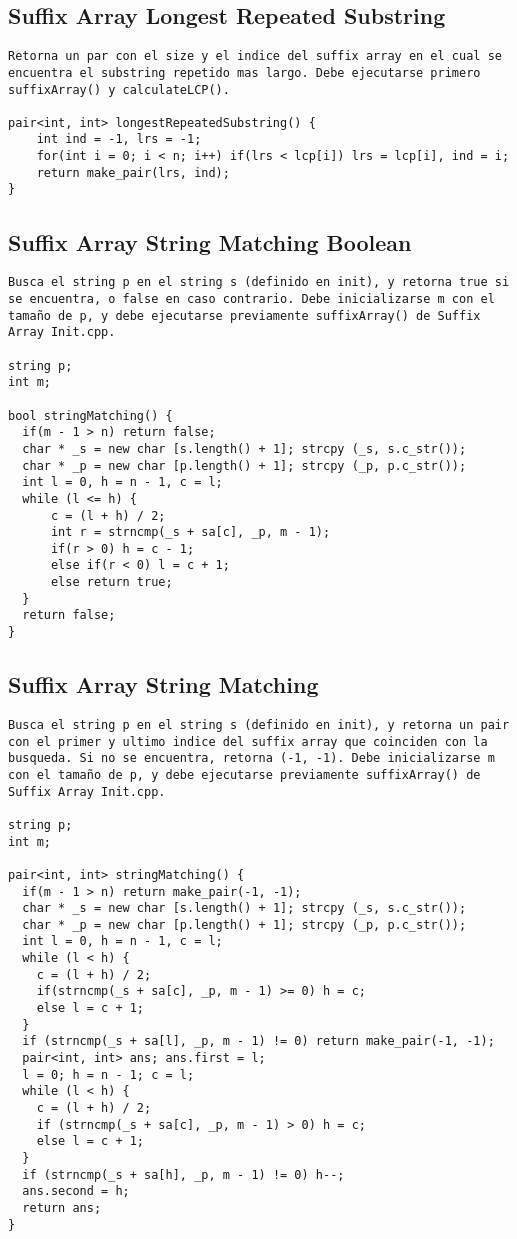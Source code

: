 \documentclass[10pt,letterpaper,twocolumn,twosided]{article}
\begin{document}
\subsection{Suffix Array Longest Repeated Substring}
\begin{lstlisting}
Retorna un par con el size y el indice del suffix array en el cual se encuentra el substring repetido mas largo. Debe ejecutarse primero suffixArray() y calculateLCP().

pair<int, int> longestRepeatedSubstring() {
	int ind = -1, lrs = -1;
	for(int i = 0; i < n; i++) if(lrs < lcp[i]) lrs = lcp[i], ind = i;
	return make_pair(lrs, ind);
}\end{lstlisting}

\subsection{Suffix Array String Matching Boolean}
\begin{lstlisting}
Busca el string p en el string s (definido en init), y retorna true si se encuentra, o false en caso contrario. Debe inicializarse m con el tamaño de p, y debe ejecutarse previamente suffixArray() de Suffix Array Init.cpp.

string p;
int m; 

bool stringMatching() {
  if(m - 1 > n) return false;
  char * _s = new char [s.length() + 1]; strcpy (_s, s.c_str());
  char * _p = new char [p.length() + 1]; strcpy (_p, p.c_str());
  int l = 0, h = n - 1, c = l;
  while (l <= h) {
      c = (l + h) / 2;
      int r = strncmp(_s + sa[c], _p, m - 1);
      if(r > 0) h = c - 1;
      else if(r < 0) l = c + 1;
      else return true;
  }
  return false;
}
  \end{lstlisting}

\subsection{Suffix Array String Matching}
\begin{lstlisting}
Busca el string p en el string s (definido en init), y retorna un pair con el primer y ultimo indice del suffix array que coinciden con la busqueda. Si no se encuentra, retorna (-1, -1). Debe inicializarse m con el tamaño de p, y debe ejecutarse previamente suffixArray() de Suffix Array Init.cpp.

string p;
int m; 

pair<int, int> stringMatching() {
  if(m - 1 > n) return make_pair(-1, -1);
  char * _s = new char [s.length() + 1]; strcpy (_s, s.c_str());
  char * _p = new char [p.length() + 1]; strcpy (_p, p.c_str());
  int l = 0, h = n - 1, c = l;
  while (l < h) {
    c = (l + h) / 2;
    if(strncmp(_s + sa[c], _p, m - 1) >= 0) h = c;
    else l = c + 1;
  }
  if (strncmp(_s + sa[l], _p, m - 1) != 0) return make_pair(-1, -1);
  pair<int, int> ans; ans.first = l;
  l = 0; h = n - 1; c = l;
  while (l < h) {
    c = (l + h) / 2;
    if (strncmp(_s + sa[c], _p, m - 1) > 0) h = c;
    else l = c + 1;
  }
  if (strncmp(_s + sa[h], _p, m - 1) != 0) h--;
  ans.second = h;
  return ans;
}\end{lstlisting}
\end{document}
